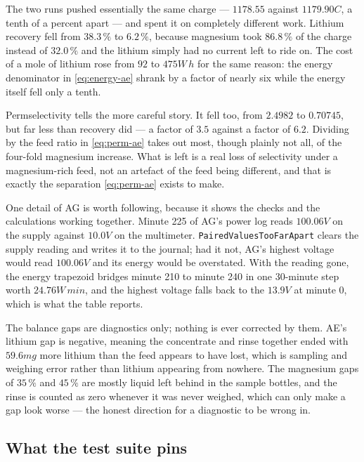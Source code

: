 The two runs pushed essentially the same charge --- $1178.55$ against
$1179.90\unit{C}$, a tenth of a percent apart --- and spent it on completely different work.
Lithium recovery fell from $38.3\,\%$ to $6.2\,\%$, because magnesium took $86.8\,\%$ of the
charge instead of $32.0\,\%$ and the lithium simply had no current left to ride on. The cost
of a mole of lithium rose from $92$ to $475\unit{W\,h}$ for the same reason: the energy
denominator in \eqref{eq:energy-ae} shrank by a factor of nearly six while the energy itself
fell only a tenth.

Permselectivity tells the more careful story. It fell too, from $2.4982$ to $0.70745$, but
far less than recovery did --- a factor of $3.5$ against a factor of $6.2$. Dividing by the
feed ratio in \eqref{eq:perm-ae} takes out most, though plainly not all, of the four-fold
magnesium increase. What is left is a real loss of selectivity under a magnesium-rich feed,
not an artefact of the feed being different, and that is exactly the separation
\eqref{eq:perm-ae} exists to make.

One detail of AG is worth following, because it shows the checks and the calculations
working together. Minute 225 of AG's power log reads $100.06\unit{V}$ on the supply against
$10.0\unit{V}$ on the multimeter. \texttt{PairedValuesTooFarApart} clears the supply reading
and writes it to the journal; had it not, AG's highest voltage would read $100.06\unit{V}$
and its energy would be overstated. With the reading gone, the energy trapezoid bridges
minute 210 to minute 240 in one $30$-minute step worth $24.76\unit{W\,min}$, and the highest
voltage falls back to the $13.9\unit{V}$ at minute 0, which is what the table reports.

The balance gaps are diagnostics only; nothing is ever corrected by them. AE's lithium gap is
negative, meaning the concentrate and rinse together ended with $59.6\unit{mg}$ more lithium
than the feed appears to have lost, which is sampling and weighing error rather than lithium
appearing from nowhere. The magnesium gaps of $35\,\%$ and $45\,\%$ are mostly liquid left
behind in the sample bottles, and the rinse is counted as zero whenever it was never weighed,
which can only make a gap look worse --- the honest direction for a diagnostic to be wrong in.

\subsection{What the test suite pins}

